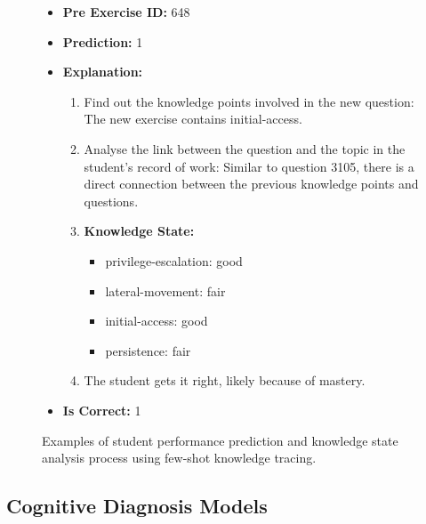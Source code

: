 \begin{figure*}[t]
\begin{tcolorbox}[
    sharpish corners,
    boxrule = 0pt,
    toprule = 0pt,
    enhanced
]
\begin{itemize}[nolistsep, leftmargin=*]
    \item \textbf{Pre Exercise ID:} 648
    \item \textbf{Prediction:} 1
    \item \textbf{Explanation:}  
    \begin{enumerate}
        \item Find out the knowledge points involved in the new question: The new exercise contains initial-access.
        \item Analyse the link between the question and the topic in the student's record of work: Similar to question 3105, there is a direct connection between the previous knowledge points and questions.
        \item \textbf{Knowledge State:}  
        \begin{itemize}[nolistsep, leftmargin=*]
            \item privilege-escalation: good
            \item lateral-movement: fair
            \item initial-access: good
            \item persistence: fair
        \end{itemize}
        \item The student gets it right, likely because of mastery.
    \end{enumerate}
    \item \textbf{Is Correct:} 1
\end{itemize}

\end{tcolorbox}
\caption{Examples of student performance prediction and knowledge state analysis process using few-shot knowledge tracing.}
\label{few shot example}
\end{figure*}

\subsection{Cognitive Diagnosis Models}

